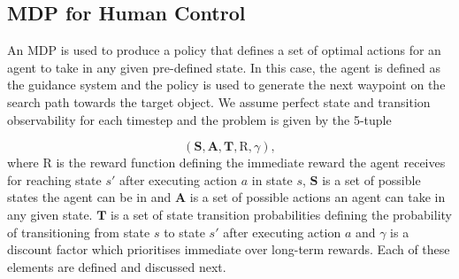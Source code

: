 \documentclass[a4paper, twoside]{article}
\begin{document}


\subsection{MDP for Human Control}

\noindent An MDP is used to produce a policy that defines a set of optimal actions for an agent to take in any given pre-defined state. In this case, the agent is defined as the guidance system and the policy is used to generate the next waypoint on the search path towards the target object. We assume perfect state and transition observability for each timestep and the problem is given by the 5-tuple

\begin{equation}
  (\mathbf{S}, \mathbf{A}, \mathbf{T}, \text{R}, \gamma), 
\end{equation}
where $\text{R}$ is the reward function defining the immediate reward the agent receives for reaching state $s'$ after executing action $a$ in state $s$, $\mathbf{S}$ is a set of possible states the agent can be in and $\mathbf{A}$ is a set of possible actions an agent can take in any given state. $\mathbf{T}$ is a set of state transition probabilities defining the probability of transitioning from state $s$ to state $s'$ after executing action $a$ and $\gamma$ is a discount factor which prioritises immediate over long-term rewards. Each of these elements are defined and discussed next.
\end{document}
